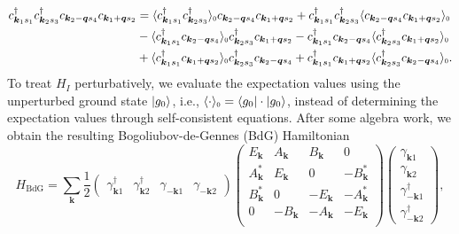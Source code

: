 \documentclass[11pt]{article}
\begin{document}
\begin{equation}
\begin{aligned}
    c^\dagger_{\bm k_1 s_1} c^\dagger_{\bm{k}_2 s_3} c_{\bm {k}_2-\bm{q} s_4} c_{\bm {k}_1 + \bm{q} s_2} &=
    \langle c^\dagger_{\bm k_1 s_1} c^\dagger_{\bm{k}_2 s_3} \rangle_{\scaleto{0}{3.5pt}}
    c_{\bm {k}_2-\bm{q} s_4} c_{\bm {k}_1 + \bm{q} s_2} +
    c^\dagger_{\bm k_1 s_1} c^\dagger_{\bm{k}_2 s_3}
    \langle c_{\bm {k}_2-\bm{q} s_4} c_{\bm {k}_1 + \bm{q} s_2}\rangle_{\scaleto{0}{3.5pt}} \\
    &-\langle c^\dagger_{\bm k_1 s_1} c_{\bm {k}_2-\bm{q} s_4} \rangle_{\scaleto{0}{3.5pt}}
     c^\dagger_{\bm{k}_2 s_3} c_{\bm {k}_1 + \bm{q} s_2}
    -c^\dagger_{\bm k_1 s_1} c_{\bm {k}_2-\bm{q} s_4}
     \langle c^\dagger_{\bm{k}_2 s_3} c_{\bm {k}_1 + \bm{q} s_2} \rangle_{\scaleto{0}{3.5pt}}\\
    &+\langle c^\dagger_{\bm k_1 s_1} c_{\bm {k}_1 + \bm{q} s_2}\rangle_{\scaleto{0}{3.5pt}}
     c^\dagger_{\bm{k}_2 s_3} c_{\bm {k}_2-\bm{q} s_4}
    +c^\dagger_{\bm k_1 s_1} c_{\bm {k}_1 + \bm{q} s_2}
     \langle c^\dagger_{\bm{k}_2 s_3} c_{\bm {k}_2-\bm{q} s_4} \rangle_{\scaleto{0}{3.5pt}}.
\end{aligned}
\end{equation}
To treat $H_I$ perturbatively, we evaluate the expectation values using the unperturbed ground state
$\left \rvert g_0 \right \rangle$, i.e., $\langle \cdot \rangle_{\scaleto{0}{3.5pt}} = \bra{g_0}\cdot \ket{g_0}$,
instead of determining the expectation values through self-consistent equations.
After some algebra work, we obtain the resulting Bogoliubov-de-Gennes (BdG) Hamiltonian
\begin{equation}\label{eq:BdG}
    H_{\text{BdG}} = \sum_{\bm k}\frac{1}{2}
    \begin{pmatrix}
    \gamma^\dagger_{\bm k 1} & \gamma^\dagger_{\bm k 2}& \gamma_{-\bm k 1}& \gamma_{-\bm k 2}
    \end{pmatrix}
    \left(
    \begin{array}{cccc}
    E_{\bm k} & A_{\bm k} & {B_{\bm k}} & 0 \\
    {A^*_{\bm k}} &  E_{\bm k}& 0 & -{B^*_{\bm k}} \\
    {B^*_{\bm k}} & 0 & -E_{\bm k} & -{A^*_{\bm k}} \\
    0 & -{B_{\bm k}} & -{A_{\bm k}} & -E_{\bm k} \\
    \end{array}
    \right)
    \begin{pmatrix}
    \gamma_{\bm k 1} \\
    \gamma_{\bm k 2} \\
    \gamma^\dagger_{-\bm k 1}\\
    \gamma^\dagger_{-\bm k 2}
    \end{pmatrix},
\end{equation}
\end{document}
